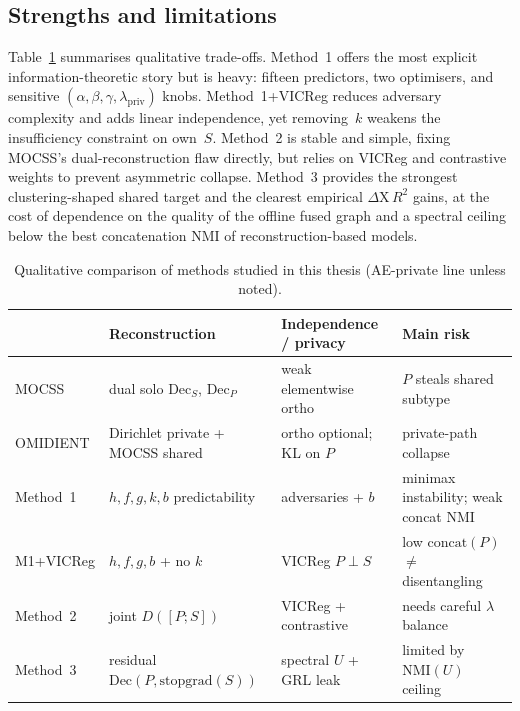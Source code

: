 \subsection{Strengths and limitations}

Table~\ref{tab:method-summary} summarises qualitative trade-offs. Method~1 offers the most explicit information-theoretic story but is heavy: fifteen predictors, two optimisers, and sensitive $(\alpha,\beta,\gamma,\lambda_{\mathrm{priv}})$ knobs. Method~1+VICReg reduces adversary complexity and adds linear independence, yet removing~$k$ weakens the insufficiency constraint on own~$S$. Method~2 is stable and simple, fixing MOCSS's dual-reconstruction flaw directly, but relies on VICReg and contrastive weights to prevent asymmetric collapse. Method~3 provides the strongest clustering-shaped shared target and the clearest empirical $\Delta\mathrm{X}\,R^{2}$ gains, at the cost of dependence on the quality of the offline fused graph and a spectral ceiling below the best concatenation NMI of reconstruction-based models.

\begin{table}[htbp]
\centering
\caption{Qualitative comparison of methods studied in this thesis (AE-private line unless noted).}
\label{tab:method-summary}
\begin{tabular}{p{2.4cm}p{3.2cm}p{3.2cm}p{3.6cm}}
\hline
 & Reconstruction & Independence / privacy & Main risk \\
\hline
MOCSS & dual solo $\mathrm{Dec}_S$, $\mathrm{Dec}_P$ & weak elementwise ortho & $P$ steals shared subtype \\
OMIDIENT & Dirichlet private + MOCSS shared & ortho optional; KL on $P$ & private-path collapse \\
Method~1 & $h,f,g,k,b$ predictability & adversaries + $b$ & minimax instability; weak concat NMI \\
M1+VICReg & $h,f,g,b$ + no $k$ & VICReg $P\perp S$ & low $\mathrm{concat}(P)$ $\neq$ disentangling \\
Method~2 & joint $D([P;S])$ & VICReg + contrastive & needs careful $\lambda$ balance \\
Method~3 & residual $\mathrm{Dec}(P,\mathrm{stopgrad}(S))$ & spectral $U$ + GRL leak & limited by $\mathrm{NMI}(U)$ ceiling \\
\hline
\end{tabular}
\end{table}
